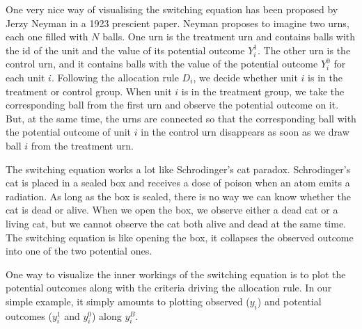 \documentclass[]{book}
\theoremstyle{definition}
\theoremstyle{definition}
\theoremstyle{definition}
\theoremstyle{remark}
\let\BeginKnitrBlock\begin \let\EndKnitrBlock\end
\begin{document}
\BeginKnitrBlock{remark}
\iffalse{} {Remark. } \fi{}One very nice way of visualising the
switching equation has been proposed by Jerzy Neyman in a 1923 prescient
paper. Neyman proposes to imagine two urns, each one filled with \(N\)
balls. One urn is the treatment urn and contains balls with the id of
the unit and the value of its potential outcome \(Y_i^1\). The other urn
is the control urn, and it contains balls with the value of the
potential outcome \(Y_i^0\) for each unit \(i\). Following the
allocation rule \(D_i\), we decide whether unit \(i\) is in the
treatment or control group. When unit \(i\) is in the treatment group,
we take the corresponding ball from the first urn and observe the
potential outcome on it. But, at the same time, the urns are connected
so that the corresponding ball with the potential outcome of unit \(i\)
in the control urn disappears as soon as we draw ball \(i\) from the
treatment urn.

The switching equation works a lot like Schrodinger's cat paradox.
Schrodinger's cat is placed in a sealed box and receives a dose of
poison when an atom emits a radiation. As long as the box is sealed,
there is no way we can know whether the cat is dead or alive. When we
open the box, we observe either a dead cat or a living cat, but we
cannot observe the cat both alive and dead at the same time. The
switching equation is like opening the box, it collapses the observed
outcome into one of the two potential ones.
\EndKnitrBlock{remark}

\BeginKnitrBlock{example}
\protect\hypertarget{exm:unnamed-chunk-6}{}{\label{exm:unnamed-chunk-6} }One
way to visualize the inner workings of the switching equation is to plot
the potential outcomes along with the criteria driving the allocation
rule. In our simple example, it simply amounts to plotting observed
(\(y_i\)) and potential outcomes (\(y_i^1\) and \(y_i^0\)) along
\(y_i^B\).
\EndKnitrBlock{example}
\end{document}
